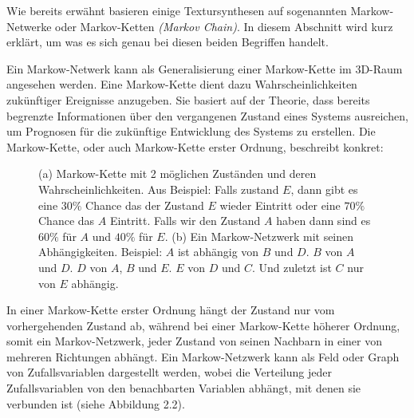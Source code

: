 \documentclass[12pt, a4paper,twoside,openright]{report} %
\begin{document}
Wie bereits erwähnt basieren einige Textursynthesen auf sogenannten Markow-Netwerke oder Markov-Ketten \textit{(Markov Chain)}.
In diesem Abschnitt wird kurz erklärt, um was es sich genau bei diesen beiden Begriffen handelt.\par
Ein Markow-Netwerk kann als Generalisierung einer Markow-Kette im 3D-Raum angesehen werden.
Eine Markow-Kette dient dazu Wahrscheinlichkeiten zukünftiger Ereignisse anzugeben.
Sie basiert auf der Theorie, dass bereits begrenzte Informationen über den vergangenen Zustand eines Systems ausreichen,
um Prognosen für die zukünftige Entwicklung des Systems zu erstellen.
Die Markow-Kette, oder auch Markow-Kette erster Ordnung, beschreibt konkret:
 \cite{wiki:Markow-Kette}

\begin{figure}[H]
    \centering
    \qquad
    \caption{(a) Markow-Kette mit 2 möglichen Zuständen und deren Wahrscheinlichkeiten. Aus \cite{wiki:Markow-Kette}
    Beispiel: Falls zustand $E$, dann gibt es eine $30\%$ Chance das der Zustand $E$ wieder Eintritt oder eine $70\%$ Chance das $A$ Eintritt.
    Falls wir den Zustand $A$ haben dann sind es $60\%$ für $A$ und $40\%$ für $E$. (b) Ein Markow-Netzwerk mit seinen Abhängigkeiten. \cite{wiki:Markov_model}
    Beispiel: $A$ ist abhängig von $B$ und $D$. $B$ von $A$ und $D$. $D$ von $A$, $B$ und $E$. $E$ von $D$ und $C$. Und zuletzt ist $C$ nur von $E$ abhängig.}%
\end{figure}

In einer Markow-Kette erster Ordnung hängt der Zustand nur vom vorhergehenden Zustand ab,
während bei einer Markow-Kette höherer Ordnung, somit ein Markov-Netzwerk, jeder Zustand von seinen Nachbarn in einer von mehreren Richtungen abhängt. \cite{wiki:Markov_model}
Ein Markow-Netzwerk kann als Feld oder Graph von Zufallsvariablen dargestellt werden,
wobei die Verteilung jeder Zufallsvariablen von den benachbarten Variablen abhängt, mit denen sie verbunden ist {(siehe Abbildung 2.2)}.
\end{document}
